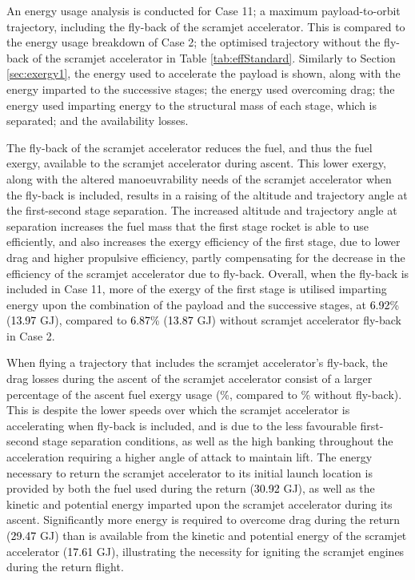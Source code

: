 An energy usage analysis is conducted for Case 11; a maximum payload-to-orbit trajectory, including the fly-back of the scramjet accelerator. This is compared to the energy usage breakdown of Case 2; the optimised trajectory without the fly-back of the scramjet accelerator in Table \ref{tab:effStandard}. Similarly to Section \ref{sec:exergy1}, the energy used to accelerate the payload is shown, along with the energy imparted to the successive stages; the energy used overcoming drag; the energy used imparting energy to the structural mass of each stage, which is separated; and the availability losses. 



The fly-back of the scramjet accelerator reduces the fuel, and thus the fuel exergy, available to the scramjet accelerator during ascent.
This lower exergy, along with the altered manoeuvrability needs of the scramjet accelerator when the fly-back is included, results in a raising of the altitude and trajectory angle at the first-second stage separation. The increased altitude and trajectory angle at separation increases the fuel mass that the first stage rocket is able to use efficiently, and also increases the exergy efficiency of the first stage, due to lower drag and higher propulsive efficiency, partly compensating for the decrease in the efficiency of the scramjet accelerator due to fly-back. Overall, when the fly-back is included in Case 11, more of the exergy of the first stage is utilised imparting energy upon the combination of the payload and the successive stages, at \textcolor{black}{6.92}\% (\textcolor{black}{13.97} GJ), compared to \textcolor{black}{6.87}\% (\textcolor{black}{13.87} GJ) without scramjet accelerator fly-back in Case 2.



When flying a trajectory that includes the scramjet accelerator's fly-back, the drag losses during the ascent of the scramjet accelerator consist of a larger percentage of the ascent fuel exergy usage  (\WDsecondStandard \%, compared to \WDsecondStandardNoReturn \% without fly-back). This is despite the lower speeds over which the scramjet accelerator is accelerating when fly-back is included, and is due to the less favourable first-second stage separation conditions, as well as the high banking throughout the acceleration requiring a higher angle of attack to maintain lift. 
The energy necessary to return the scramjet accelerator to its initial launch location is provided by both the fuel used during the return (\textcolor{black}{30.92} GJ), as well as the kinetic and potential energy imparted upon the scramjet accelerator during its ascent. Significantly more energy is required to overcome drag during the return (\textcolor{black}{29.47} GJ) than is available from the kinetic and potential energy of the scramjet accelerator (\textcolor{black}{17.61} GJ), illustrating the necessity for igniting the scramjet engines during the return flight. 


